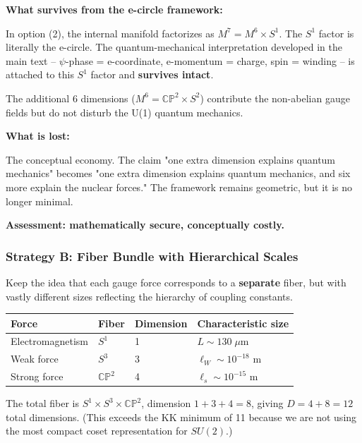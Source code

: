 \documentclass[aps,prd,preprint,superscriptaddress,longbibliography,floatfix]{revtex4-2}
\theoremstyle{remark}
\begin{document}
\textbf{What survives from the e-circle framework:}

In option (2), the internal manifold factorizes as $M^7 = M^6 \times S^1$. The $S^1$ factor is literally the e-circle. The quantum-mechanical interpretation developed in the main text -- $\psi$-phase = e-coordinate, e-momentum = charge, spin = winding -- is attached to this $S^1$ factor and \textbf{survives intact}.

The additional 6 dimensions ($M^6 = \mathbb{CP}^2 \times S^2$) contribute the non-abelian gauge fields but do not disturb the U(1) quantum mechanics.

\textbf{What is lost:}

The conceptual economy. The claim "one extra dimension explains quantum mechanics" becomes "one extra dimension explains quantum mechanics, and six more explain the nuclear forces." The framework remains geometric, but it is no longer minimal.

\textbf{Assessment: mathematically secure, conceptually costly.}



\subsubsection{Strategy B: Fiber Bundle with Hierarchical Scales}

Keep the idea that each gauge force corresponds to a \textbf{separate} fiber, but with vastly different sizes reflecting the hierarchy of coupling constants.


\begin{table}[H]
\begin{ruledtabular}
\begin{tabular}{p{3.8cm}p{3.8cm}p{3.8cm}p{3.8cm}}
Force & Fiber & Dimension & Characteristic size \\
\hline
Electromagnetism & $S^1$ & 1 & $L \sim 130\;\mu\text{m}$ \\
Weak force & $S^3$ & 3 & $\ell_W \sim 10^{-18}$ m \\
Strong force & $\mathbb{CP}^2$ & 4 & $\ell_s \sim 10^{-15}$ m \\
\end{tabular}
\end{ruledtabular}
\end{table}

The total fiber is $S^1 \times S^3 \times \mathbb{CP}^2$, dimension $1 + 3 + 4 = 8$, giving $D = 4 + 8 = 12$ total dimensions. (This exceeds the KK minimum of 11 because we are not using the most compact coset representation for $SU(2)$.)
\end{document}
